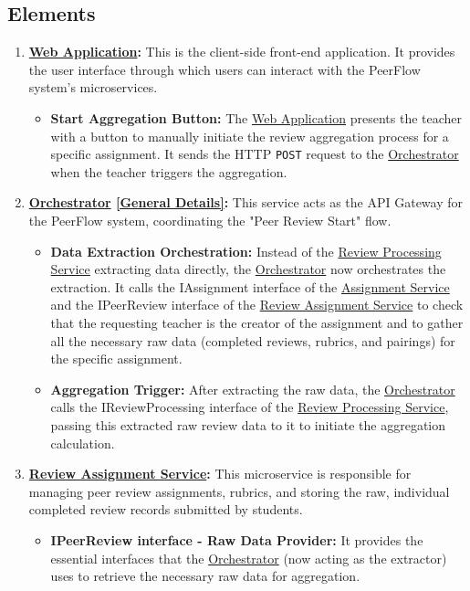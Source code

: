 \subsection{Elements}

\begin{enumerate}
    \item \textbf{\hyperref[def:WebApplication]{Web Application}:} This is the client-side front-end application. It provides the user interface through which users can interact with the PeerFlow system’s microservices.
    \begin{itemize}
        \item \textbf{Start Aggregation Button:} The \hyperref[def:WebApplication]{Web Application} presents the teacher with a button to manually initiate the review aggregation process for a specific assignment. It sends the HTTP \texttt{POST} request to the \hyperref[def:Orchestrator]{Orchestrator} when the teacher triggers the aggregation.
    \end{itemize}
    
    \item \textbf{\hyperref[def:Orchestrator]{Orchestrator} \hyperref[def:GenDetailsOrchestrator]{[General Details]}:} This service acts as the API Gateway for the PeerFlow system, coordinating the "Peer Review Start" flow.
    \begin{itemize}
        \item \textbf{Data Extraction Orchestration:} Instead of the \hyperref[def:ReviewProcessingService]{Review Processing Service} extracting data directly, the \hyperref[def:Orchestrator]{Orchestrator} now orchestrates the extraction. It calls the IAssignment interface of the \hyperref[def:AssignmentService]{Assignment Service} and the IPeerReview interface of the \hyperref[def:ReviewAssignmentService]{Review Assignment Service} to check that the requesting teacher is the creator of the assignment and to gather all the necessary raw data (completed reviews, rubrics, and pairings) for the specific assignment.
        
        \item \textbf{Aggregation Trigger:} After extracting the raw data, the \hyperref[def:Orchestrator]{Orchestrator} calls the IReviewProcessing interface of the \hyperref[def:ReviewProcessingService]{Review Processing Service}, passing this extracted raw review data to it to initiate the aggregation calculation.
    \end{itemize}
    \item \textbf{\hyperref[def:ReviewAssignmentService]{Review Assignment Service}:} This microservice is responsible for managing peer review assignments, rubrics, and storing the raw, individual completed review records submitted by students.
    \begin{itemize}
        \item \textbf{IPeerReview interface - Raw Data Provider:} It provides the essential interfaces that the \hyperref[def:Orchestrator]{Orchestrator} (now acting as the extractor) uses to retrieve the necessary raw data for aggregation.
        

\end{itemize}
\end{enumerate}
